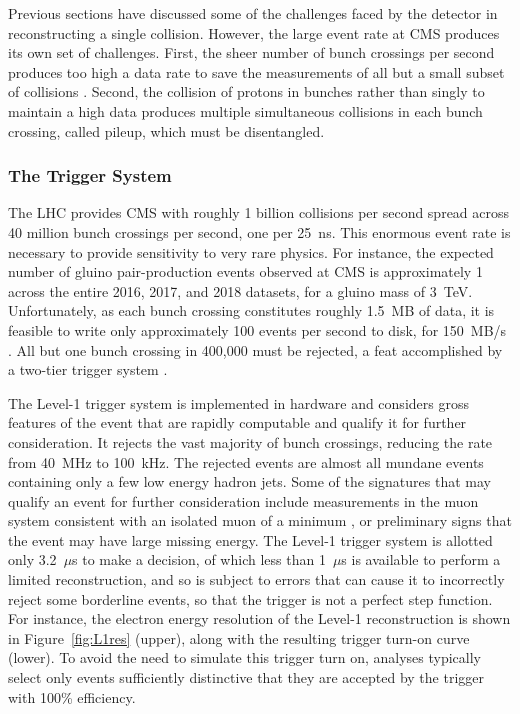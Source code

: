   Previous sections have discussed some of the challenges faced by the detector in reconstructing a single collision.
  However, the large event rate at CMS produces its own set of challenges.
  First, the sheer number of bunch crossings per second produces too high a data rate to save the measurements of all but a small subset of collisions \cite{cmstdr}.
  Second, the collision of protons in bunches rather than singly to maintain a high data produces multiple simultaneous collisions in each bunch crossing, called pileup, which must be disentangled.
  
    \subsubsection{The Trigger System} \label{sec:trigger}

    The LHC provides CMS with roughly 1 billion collisions per second spread across 40 million bunch crossings per second, one per 25~ns.
    This enormous event rate is necessary to provide sensitivity to very rare physics.
    For instance, the expected number of gluino pair-production events observed at CMS is approximately 1 across the entire 2016, 2017, and 2018 datasets, for a gluino mass of 3~TeV.
    Unfortunately, as each bunch crossing constitutes roughly 1.5~MB of data, it is feasible to write only approximately 100 events per second to disk, for 150~MB/s \cite{cmstdr}.
    All but one bunch crossing in 400,000 must be rejected, a feat accomplished by a two-tier trigger system \cite{trigger}.
    
    The Level-1 trigger system is implemented in hardware and considers gross features of the event that are rapidly computable and qualify it for further consideration.
    It rejects the vast majority of bunch crossings, reducing the rate from 40~MHz to 100~kHz.
    The rejected events are almost all mundane events containing only a few low energy hadron jets.
    Some of the signatures that may qualify an event for further consideration include measurements in the muon system consistent with an isolated muon of a minimum \pt, or preliminary signs that the event may have large missing energy.
    The Level-1 trigger system is allotted only 3.2~$\mu$s to make a decision, of which less than 1~$\mu$s is available to perform a limited reconstruction, and so is subject to errors that can cause it to incorrectly reject some borderline events, so that the trigger is not a perfect step function.
    For instance, the electron energy resolution of the Level-1 reconstruction is shown in Figure~\ref{fig:L1res} (upper), along with the resulting trigger turn-on curve (lower).
    To avoid the need to simulate this trigger turn on, analyses typically select only events sufficiently distinctive that they are accepted by the trigger with 100\% efficiency.

